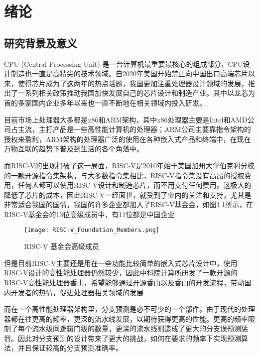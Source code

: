 
\chapter{绪论}

\section{研究背景及意义}
CPU (Central Processing Unit) 是一台计算机最重要最核心的组成部分，CPU设计制造也一直是高精尖的技术领域。自2020年美国开始禁止向中国出口高端芯片以来，使得芯片成为了这两年的热点话题，我国更加注重处理器设计领域的发展，推出了一系列相关政策推动我国加快发展自己的芯片设计和制造产业。其中以龙芯为首的多家国内企业多年以来也一直不断地在相关领域内投入研发。

目前市场上处理器大多都是x86和ARM架构，其中x86处理器主要是Intel和AMD公司占主流，主打产品是一些高性能计算机的处理器；ARM公司主要靠指令架构的授权来盈利，ARM架构的处理器广泛的使用在各种嵌入式产品和终端中，在现在万物互联的趋势下普及到生活的各个角落中。

而RISC-V的出现打破了这一局面，RISC-V是2010年始于美国加州大学伯克利分校的一款开源指令集架构，与大多数指令集相比，RISC-V指令集没有高昂的授权费用，任何人都可以使用RISC-V设计和制造芯片，而不用支付任何费用。这极大的降低了芯片的成本，因此RISC-V一经面世，就受到了业内的关注和支持，尤其是非常适合我国的国情，我国的许多企业都加入了RISC-V基金会，如图1.1所示，在RISC-V基金会的13位高级成员中，有11位都是中国企业

\begin{figure}[htb]
	\centering
	\setlength\tabcolsep{3pt}  %
	\vspace{5pt} %
	\texttt{[image: RISC-V\_Foundation\_Members.png]}
	\caption{RISC-V 基金会高级成员}
	\label{fig:figure1}
\end{figure}

但是目前RISC-V主要还是用在一些功能比较简单的嵌入式芯片设计中，使用RISC-V设计的高性能处理器仍然较少，因此中科院计算所研发了一款开源的RISC-V高性能处理器香山，希望能够通过开源香山以及香山的开发流程，带动国内开发者的热情，促进处理器相关领域的发展

而在一个高性能处理器架构里，分支预测是必不可少的一个部件。由于现代的处理器都在往更高的频率，更深的流水线发展，以期待获得更高的性能。更高的频率限制了每个流水级间逻辑门级的数量，更深的流水线则造成了更大的分支误预测惩罚。因此对分支预测的设计带来了更大的挑战，如何在要求的频率下实现预测算法，并且保证较高的分支预测准确率。

